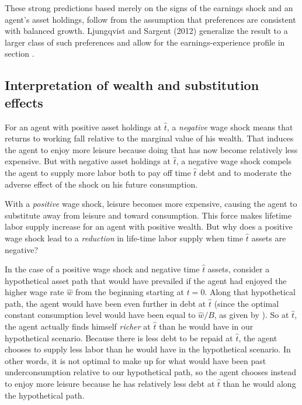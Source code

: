 These strong predictions based merely on the signs of the
earnings shock and an agent's asset holdings, follow from the
assumption that preferences are consistent with
balanced growth. Ljungqvist and Sargent (2012) generalize the
result to a larger class of such preferences and allow for
the earnings-experience profile in section .


\subsection{Interpretation of wealth and substitution effects}

For an agent with positive asset holdings at $\hat t$, a {\it negative}
wage shock means that returns to working fall relative to the marginal
value of his wealth.  That induces the agent
 to enjoy more leisure  because doing that has now become
relatively less expensive. But with negative asset holdings at $\hat t$,
a negative wage shock compels the agent to supply more labor both to pay off  time $\hat t$ debt and to  moderate the adverse effect of the shock on  his future consumption.

With a {\it positive} wage shock, leisure becomes more expensive, causing the
agent to substitute away  from leisure and toward consumption. This force makes  lifetime labor supply
increase for an agent with positive wealth. But why does a positive
wage shock lead to a {\it reduction} in life-time labor supply when time $\hat t$ assets are
negative?

In the case of a positive wage shock and negative time $\hat t$ assets,
consider  a hypothetical  asset
path that would have prevailed if the agent had enjoyed the higher wage
rate $\hat w$
from the beginning starting at $t=0$. Along that hypothetical path, the agent would have been even further
in debt at $\hat t$ (since the optimal constant consumption level would have been
equal to $\hat w /B$, as given by ).
So  at $\hat t$,  the
agent actually finds himself {\it richer} at $\hat t$ than he would have  in our hypothetical  scenario.
Because there
is less debt to be repaid at $\hat t$,  the agent chooses to supply less
labor than he would have in  the hypothetical scenario.
In other words,  it is not optimal to
make up for what would have been  past underconsumption relative to our hypothetical path, so the agent chooses instead to
enjoy more leisure  because he has relatively less debt  at $\hat t$ than he would along the hypothetical path.



